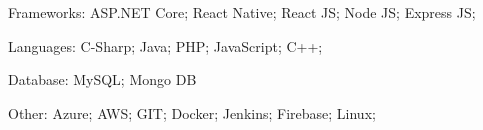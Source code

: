 

\begin{cventries}

  \cventry
    {} %
    {} %
    {} %
    {} %
    {
      \begin{cvitems} %
        \item {Frameworks: ASP.NET Core; React Native; React JS; Node JS; Express JS;}
        \item {Languages: C-Sharp; Java; PHP; JavaScript; C++;}
        \item {Database: MySQL; Mongo DB}
        \item {Other: Azure; AWS; GIT; Docker; Jenkins; Firebase; Linux;}
      \end{cvitems}
    }

   

\end{cventries}
